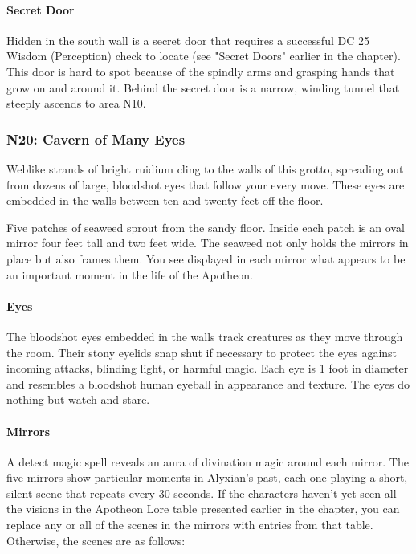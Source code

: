\documentclass[10pt,a4paper,twoside,bg=print,twocolumn,openany,nodeprecatedcode]{dndbook}
\begin{document}
\paragraph{Secret Door}
Hidden in the south wall is a secret door that requires a successful DC 25 Wisdom (Perception) check to locate (see "Secret Doors" earlier in the chapter). This door is hard to spot because of the spindly arms and grasping hands that grow on and around it. Behind the secret door is a narrow, winding tunnel that steeply ascends to area N10.

\subsubsection{N20: Cavern of Many Eyes}
\begin{DndReadAloud}{}
Weblike strands of bright ruidium cling to the walls of this grotto, spreading out from dozens of large, bloodshot eyes that follow your every move. These eyes are embedded in the walls between ten and twenty feet off the floor.

Five patches of seaweed sprout from the sandy floor. Inside each patch is an oval mirror four feet tall and two feet wide. The seaweed not only holds the mirrors in place but also frames them. You see displayed in each mirror what appears to be an important moment in the life of the Apotheon.

\end{DndReadAloud}

\paragraph{Eyes}
The bloodshot eyes embedded in the walls track creatures as they move through the room. Their stony eyelids snap shut if necessary to protect the eyes against incoming attacks, blinding light, or harmful magic. Each eye is 1 foot in diameter and resembles a bloodshot human eyeball in appearance and texture. The eyes do nothing but watch and stare.

\paragraph{Mirrors}
A detect magic spell reveals an aura of divination magic around each mirror. The five mirrors show particular moments in Alyxian's past, each one playing a short, silent scene that repeats every 30 seconds. If the characters haven't yet seen all the visions in the Apotheon Lore table presented earlier in the chapter, you can replace any or all of the scenes in the mirrors with entries from that table. Otherwise, the scenes are as follows:
\end{document}
